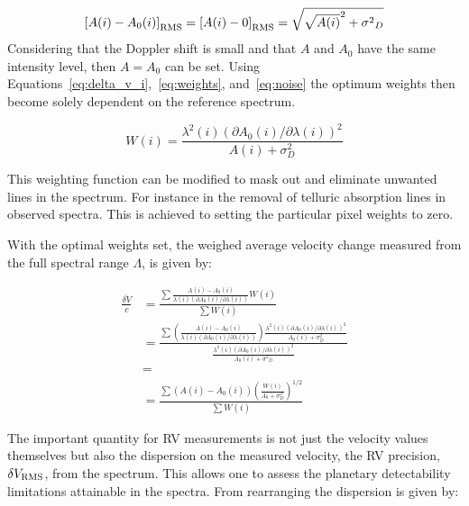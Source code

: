 \begin{equation}
{[{A(i)-A_0(i)}]}_{\textrm{RMS}} = {[{A(i)} - 0]}_{\textrm{RMS}} = \sqrt{{\sqrt{A(i)}}^{2} + {\sigma^{2}}_{D}} \label{eq:noise}
\end{equation}
Considering that the Doppler shift is small and that \(A\) and \(A_0\) have the same intensity level, then \(A = A_0\) can be set. Using Equations~\ref{eq:delta_v_i},~\ref{eq:weights}, and~\ref{eq:noise} the optimum weights then become solely dependent on the reference spectrum.

\begin{equation}
W(i) = \frac{{\lambda}^{2}(i) {({\partial A_0(i)}/{\partial \lambda(i)})}^{2}}{A(i) + {\sigma}^{2}_{D}} \label{eq:optimal_weight}
\end{equation}

This weighting function can be modified to mask out and eliminate unwanted lines in the spectrum. For instance in the removal of telluric absorption lines in observed spectra. This is achieved to setting the particular pixel weights to zero.

With the optimal weights set, the weighed average velocity change measured from the full spectral range \(\Lambda\), is given by:

\begin{eqnarray}
    \frac{\overline{\delta V}}{c} &= \frac{
        \sum{
            \frac{
                A(i) - A_0(i)}{
                \lambda(i) \left({\partial A_0(i)}/{\partial \lambda(i)}\right)} W(i)}}{
             \sum{{W(i)}}} \\
    &= \frac{
        \sum {
            (\frac
                {A(i) - A_0(i)}
                {\lambda(i) (\partial A_0(i)/\partial \lambda(i))}) \frac
                    {\lambda^{2}(i) {({\partial A_0(i)}/{\partial \lambda(i)})}^{2}}
                    {A_{0}(i) + {\sigma}^{2}_{D}}
                 }
         }
    {\frac
        {\lambda^{2}(i) {({\partial A_0(i)}/{\partial \lambda(i)})}^{2}}{A_{0}(i) + {{\sigma}^{2}}_{D}}
        } \\
    &= \\
    &= \frac{\sum{(A(i) - A_0(i)){\left(\frac{W(i)}{A_0 +{\sigma}_{D}^{2}}\right)}^{1/2}}}{\sum{W(i)}}
    \label{eq:delta_v_eqarray}
\end{eqnarray}

The important quantity for {RV} measurements is not just the velocity values themselves but also the dispersion on the measured velocity, the RV precision, \(\delta V_{\textrm{RMS}}\), from the spectrum. This allows one to assess the planetary detectability limitations attainable in the spectra. From rearranging  the dispersion is given by:

